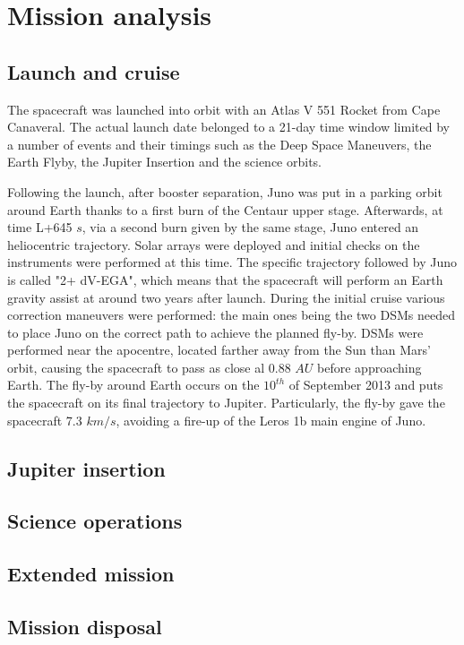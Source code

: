 \section{Mission analysis}
\label{sec:mission_analysis}

\subsection{Launch and cruise}
\label{sec: lancio e crociera}

The spacecraft was launched into orbit with an Atlas V 551 Rocket from Cape Canaveral. The actual launch date belonged to a 21-day time window limited by a number of events and their timings such as the Deep Space Maneuvers, the Earth Flyby, the Jupiter Insertion and the science orbits. %

Following the launch, after booster separation, Juno was put in a parking orbit around Earth thanks to a first burn of the Centaur upper stage. Afterwards, at time L+645 $s$, via a second burn given by the same stage, Juno entered an heliocentric trajectory. Solar arrays were deployed and initial checks on the instruments were performed at this time. %
The specific trajectory followed by Juno is called "2+ dV-EGA", which means that the spacecraft will perform an Earth gravity assist at around two years after launch.
During the initial cruise various correction maneuvers were performed: the main ones being the two DSMs needed to place Juno on the correct path to achieve the planned fly-by. 
DSMs were performed near the apocentre, located farther away from the Sun than Mars' orbit, causing the spacecraft to pass as close al 0.88 $AU$ before approaching Earth. %
The fly-by around Earth occurs on the $10^{th}$ of September 2013 and puts the spacecraft on its final trajectory to Jupiter. Particularly, the fly-by gave the spacecraft 7.3 $km/s$, avoiding a fire-up of the Leros 1b main engine of Juno. 


\subsection{Jupiter insertion}
\label{sec: joi}

\subsection{Science operations}
\label{sec: science ops}

\subsection{Extended mission}
\label{sec: extended}

\subsection{Mission disposal}
\label{sec: disposal}

